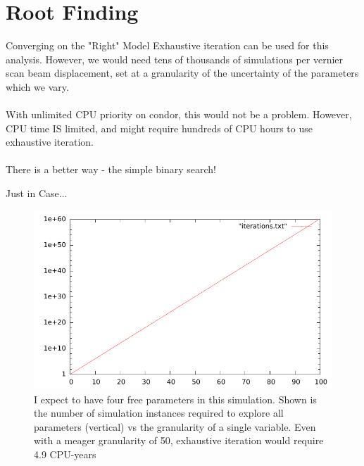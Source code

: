 \section{Root Finding}
\label{Root Finding}

\begin{frame}{Converging on the "Right" Model}
Exhaustive iteration can be used for this analysis. However, we would need tens
of thousands of simulations per vernier scan beam displacement, set at a
granularity of the uncertainty of the parameters which we vary. \\~\\
With unlimited CPU priority on condor, this would not be a problem. However,
CPU time IS limited, and might require hundreds of CPU hours to use exhaustive
iteration.\\~\\
There is a better way - the simple binary search!
\end{frame}

\begin{frame}{Just in Case...}
\begin{figure}
\begin{center}
\includegraphics[width=0.7\linewidth]{../RootFinding/figs/iterations.pdf}
\end{center}
\caption{
	I expect to have four free parameters in this simulation. Shown is the number
	of simulation instances required to explore all parameters (vertical) vs the
	granularity of a single variable. Even with a meager granularity of 50,
	exhaustive iteration would require 4.9 CPU-years }
\label{fig:iterations}
\end{figure}
\end{frame}


